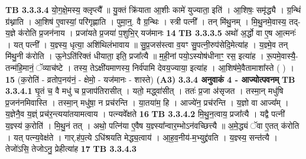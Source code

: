 \documentclass[17pt]{extarticle}
\begin{document}
{{{{{{{{{{{{{{{{{{{                                \textbf{ TB 3.3.3.4} \newline
                  यो॒ग॒क्षे॒मस्य॒ क्लृप्त्यै᳚ ॥ यु॒क्तं क्रि॑याता आ॒शीः कामे॑ युज्याता॒ इति॑ । आ॒शिषः॒ समृ॑द्ध्यै । ग्र॒न्थिं ग्र॑थ्नाति । आ॒शिष॑ ए॒वास्यां॒ परि॑गृह्णाति । पुमा॒न्॒. वै ग्र॒न्थिः । स्त्री पत्नी᳚ । तन् मि॑थु॒नम् । मि॒थु॒नमे॒वास्य॒ तद्-य॒ज्ञे क॑रोति प्र॒जन॑नाय । प्रजा॑यते प्र॒जया॑ प॒शुभि॒र् यज॑मानः \textbf{ 14} \newline
                  \newline
                                \textbf{ TB 3.3.3.5} \newline
                  अथो॑ अ॒र्द्धो वा ए॒ष आ॒त्मनः॑ । यत् पत्नी᳚ । य॒ज्ञ्स्य॒ धृत्या॒ अशि॑थिलंभावाय ॥ सु॒प्र॒जस॑स्त्वा व॒यꣳ सु॒पत्नी॒रुप॑सेदि॒मेत्या॑ह । य॒ज्ञ्मे॒व तन् मि॑थु॒नी क॑रोति । ऊ॒नेऽति॑रिक्तं धीयाता॒ इति॒ प्रजा᳚त्यै ॥ म॒ही॒नां पयो॒ऽस्योष॑धीनाꣳ॒॒ रस॒ इत्या॑ह । रू॒पमे॒वास्यै॒-तन्म॑हि॒मानं॒ ॅव्याच॑ष्टे । तस्य॒ तेऽक्षी॑यमाणस्य॒ निर्व॑पामि देवय॒ज्याया॒ इत्या॑ह । आ॒शिष॑मे॒वैतामाशा᳚स्ते ( ) । \textbf{ 15} \newline
                  \newline
                                    (क॒रोति॑ - व्रतोप॒नय॑नं॒ - क्षेमो॒ - यज॑मानः - शास्ते) \textbf{(A3)} \newline \newline
                \textbf{ 3.3.4     अनुवाकं   4 - आज्योत्पवनम्} \newline
                                \textbf{ TB 3.3.4.1} \newline
                  घृ॒तं च॒ वै मधु॑ च प्र॒जाप॑तिरासीत् । यतो॒ मद्ध्वा॑सीत् । ततः॑ प्र॒जा अ॑सृजत । तस्मा॒न् मधु॑षि प्र॒जन॑नमिवास्ति । तस्मा॒न् मधु॑षा॒ न प्रच॑रन्ति । या॒तया॑म॒ हि । आज्ये॑न॒ प्रच॑रन्ति । य॒ज्ञो वा आज्य᳚म् । य॒ज्ञेनै॒व य॒ज्ञ्ं प्रच॑र॒न्त्यया॑तयामत्वाय । पत्न्यवे᳚क्षते \textbf{ 16} \newline
                  \newline
                                \textbf{ TB 3.3.4.2} \newline
                  मि॒थु॒न॒त्वाय॒ प्रजा᳚त्यै । यद्वै पत्नी॑ य॒ज्ञ्स्य॑ क॒रोति॑ । मि॒थु॒नं तत् । अथो॒ पत्नि॑या ए॒वैष य॒ज्ञ्स्या᳚न्वार॒म्भोऽन॑वच्छित्त्यै ॥ अ॒मे॒द्ध्यं ॅवा ए॒तत् क॑रोति । यत् पत्न्य॒वेक्ष॑ते । गार्.ह॑प॒त्ये ऽधि॑श्रयति मेद्ध्य॒त्वाय॑ । आ॒ह॒व॒नीय॑-म॒भ्युद्द्र॑वति । य॒ज्ञ्स्य॒ सन्त॑त्यै । तेजो॑ऽसि॒ तेजोऽनु॒ प्रेहीत्या॑ह \textbf{ 17} \newline
                  \newline
                                \textbf{ TB 3.3.4.3} \newline
}}}}}}}}}}}}}}}}}}}
\end{document}
